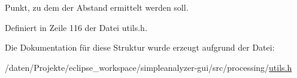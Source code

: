 Punkt, zu dem der Abstand ermittelt werden soll. 



Definiert in Zeile 116 der Datei utils.\-h.



Die Dokumentation für diese Struktur wurde erzeugt aufgrund der Datei\-:\begin{DoxyCompactItemize}
\item 
/daten/\-Projekte/eclipse\-\_\-workspace/simpleanalyzer-\/gui/src/processing/\hyperlink{utils_8h}{utils.\-h}\end{DoxyCompactItemize}
